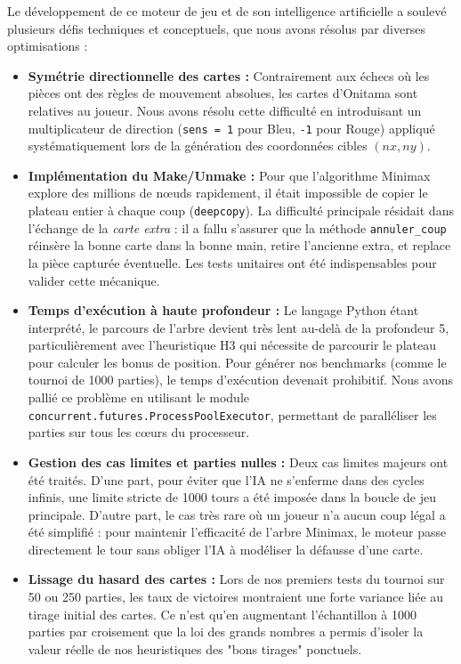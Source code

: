 \documentclass[12pt, a4paper]{article}
\begin{document}
Le développement de ce moteur de jeu et de son intelligence artificielle a soulevé plusieurs 
défis techniques et conceptuels, que nous avons résolus par diverses optimisations :

\begin{itemize}
  \item \textbf{Symétrie directionnelle des cartes :} Contrairement aux échecs où les pièces ont des 
        règles de mouvement absolues, les cartes d'Onitama sont relatives au joueur. Nous avons résolu 
        cette difficulté en introduisant un multiplicateur de direction (\texttt{sens = 1} pour Bleu, 
        \texttt{-1} pour Rouge) appliqué systématiquement lors de la génération des coordonnées cibles $(nx, ny)$.
  
  \item \textbf{Implémentation du Make/Unmake :} Pour que l'algorithme Minimax explore des millions 
        de nœuds rapidement, il était impossible de copier le plateau entier à chaque coup (\texttt{deepcopy}). 
        La difficulté principale résidait dans l'échange de la \textit{carte extra} : il a fallu s'assurer 
        que la méthode \texttt{annuler\_coup} réinsère la bonne carte dans la bonne main, retire l'ancienne 
        extra, et replace la pièce capturée éventuelle. Les tests unitaires ont été indispensables pour 
        valider cette mécanique.

  \item \textbf{Temps d'exécution à haute profondeur :} Le langage Python étant interprété, le parcours 
        de l'arbre devient très lent au-delà de la profondeur 5, particulièrement avec l'heuristique H3 
        qui nécessite de parcourir le plateau pour calculer les bonus de position. Pour générer nos 
        benchmarks (comme le tournoi de 1000 parties), le temps d'exécution devenait prohibitif. Nous avons 
        pallié ce problème en utilisant le module \texttt{concurrent.futures.ProcessPoolExecutor}, permettant 
        de paralléliser les parties sur tous les cœurs du processeur.

  \item \textbf{Gestion des cas limites et parties nulles :} Deux cas limites majeurs ont été traités. 
        D'une part, pour éviter que l'IA ne s'enferme dans des cycles infinis, une limite stricte de 
        1000 tours a été imposée dans la boucle de jeu principale. D'autre part, le cas très rare où un 
        joueur n'a aucun coup légal a été simplifié : pour maintenir l'efficacité de l'arbre Minimax, 
        le moteur passe directement le tour sans obliger l'IA à modéliser la défausse d'une carte.
        
  \item \textbf{Lissage du hasard des cartes :} Lors de nos premiers tests du tournoi sur 50 ou 250 parties, 
        les taux de victoires montraient une forte variance liée au tirage initial des cartes. Ce n'est qu'en 
        augmentant l'échantillon à 1000 parties par croisement que la loi des grands nombres a permis 
        d'isoler la valeur réelle de nos heuristiques des "bons tirages" ponctuels.
\end{itemize}
\end{document}
